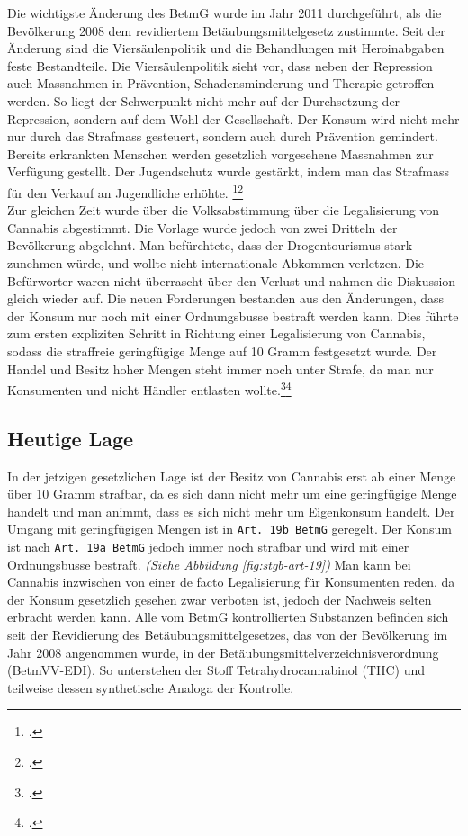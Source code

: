\documentclass[../main.tex]{subfiles}
\begin{document}
	 \noindent
	 Die wichtigste Änderung des BetmG wurde im Jahr 2011 durchgeführt, als die Bevölkerung 2008 dem revidiertem Betäubungsmittelgesetz zustimmte. 
	 Seit der Änderung sind die Viersäulenpolitik und die Behandlungen mit Heroinabgaben feste Bestandteile. 
	 Die Viersäulenpolitik sieht vor, dass neben der Repression auch Massnahmen in Prävention, Schadensminderung und Therapie getroffen werden.
	 So liegt der Schwerpunkt nicht mehr auf der Durchsetzung der Repression, sondern auf dem Wohl der Gesellschaft.
	 Der Konsum wird nicht mehr nur durch das Strafmass gesteuert, sondern auch durch Prävention gemindert. 
	 Bereits erkrankten Menschen werden gesetzlich vorgesehene Massnahmen zur Verfügung gestellt.
	 Der Jugendschutz wurde gestärkt, indem man das Strafmass für den Verkauf an Jugendliche erhöhte. \footcite{infoset-01}\footcite{parlament-01}\\
	 
	 \noindent
	 Zur gleichen Zeit wurde über die Volksabstimmung über die Legalisierung von Cannabis abgestimmt.
	 Die Vorlage wurde jedoch von zwei Dritteln der Bevölkerung abgelehnt.
	 Man befürchtete, dass der Drogentourismus stark zunehmen würde, und wollte nicht internationale Abkommen verletzen.
	 Die Befürworter waren nicht überrascht über den Verlust und nahmen die Diskussion gleich wieder auf. 
	 Die neuen Forderungen bestanden aus den Änderungen, dass der Konsum nur noch mit einer Ordnungsbusse bestraft werden kann. 
	 Dies führte zum ersten expliziten Schritt in Richtung einer Legalisierung von Cannabis, sodass die straffreie geringfügige Menge auf 10 Gramm festgesetzt wurde.
	 Der Handel und Besitz hoher Mengen steht immer noch unter Strafe, da man nur Konsumenten und nicht Händler entlasten wollte.\footcite{infoset-02}\footcite{parlament-02}
	 
	 
	 \subsection{Heutige Lage}
	 In der jetzigen gesetzlichen Lage ist der Besitz von Cannabis erst ab einer Menge über 10 Gramm strafbar, da es sich dann nicht mehr um eine geringfügige Menge handelt und man animmt, dass es sich nicht mehr um Eigenkonsum handelt.
	 Der Umgang mit geringfügigen Mengen ist in \texttt{Art. 19b BetmG} geregelt.
	 Der Konsum ist nach \texttt{Art. 19a BetmG} jedoch immer noch strafbar und wird mit einer Ordnungsbusse bestraft. \textit{(Siehe Abbildung \ref{fig:stgb-art-19})}
	 Man kann bei Cannabis inzwischen von einer de facto Legalisierung für Konsumenten reden, da der Konsum gesetzlich gesehen zwar verboten ist, jedoch der Nachweis selten erbracht werden kann. 
	 Alle vom BetmG kontrollierten Substanzen befinden sich seit der Revidierung des Betäubungsmittelgesetzes, das von der Bevölkerung im Jahr 2008 angenommen wurde, in der Betäubungsmittelverzeichnisverordnung (BetmVV-EDI). 
	 So unterstehen der Stoff Tetrahydrocannabinol (THC) und teilweise dessen synthetische Analoga der Kontrolle.\vspace{2pt}
	 
\end{document}
